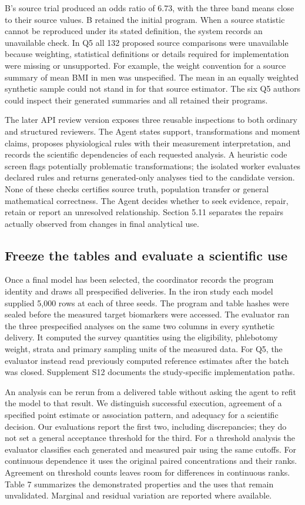 \documentclass[11pt,letterpaper]{article}
\begin{document}
B's source trial produced an odds ratio of 6.73, with the three band means close to their source values. B retained the initial program. When a source statistic cannot be reproduced under its stated definition, the system records an unavailable check. In Q5 all 132 proposed source comparisons were unavailable because weighting, statistical definitions or details required for implementation were missing or unsupported. For example, the weight convention for a source summary of mean BMI in men was unspecified. The mean in an equally weighted synthetic sample could not stand in for that source estimator. The six Q5 authors could inspect their generated summaries and all retained their programs.


The later API review version exposes three reusable inspections to both ordinary and structured reviewers. The Agent states support, transformations and moment claims, proposes physiological rules with their measurement interpretation, and records the scientific dependencies of each requested analysis. A heuristic code screen flags potentially problematic transformations; the isolated worker evaluates declared rules and returns generated-only analyses tied to the candidate version. None of these checks certifies source truth, population transfer or general mathematical correctness. The Agent decides whether to seek evidence, repair, retain or report an unresolved relationship. Section 5.11 separates the repairs actually observed from changes in final analytical use.


\subsection{Freeze the tables and evaluate a scientific use}

Once a final model has been selected, the coordinator records the program identity and draws all prespecified deliveries. In the iron study each model supplied 5,000 rows at each of three seeds. The program and table hashes were sealed before the measured target biomarkers were accessed. The evaluator ran the three prespecified analyses on the same two columns in every synthetic delivery. It computed the survey quantities using the eligibility, phlebotomy weight, strata and primary sampling units of the measured data. For Q5, the evaluator instead read previously computed reference estimates after the batch was closed. Supplement S12 documents the study-specific implementation paths.


An analysis can be rerun from a delivered table without asking the agent to refit the model to that result. We distinguish successful execution, agreement of a specified point estimate or association pattern, and adequacy for a scientific decision. Our evaluations report the first two, including discrepancies; they do not set a general acceptance threshold for the third. For a threshold analysis the evaluator classifies each generated and measured pair using the same cutoffs. For continuous dependence it uses the original paired concentrations and their ranks. Agreement on threshold counts leaves room for differences in continuous ranks. Table 7 summarizes the demonstrated properties and the uses that remain unvalidated. Marginal and residual variation are reported where available.
\end{document}
